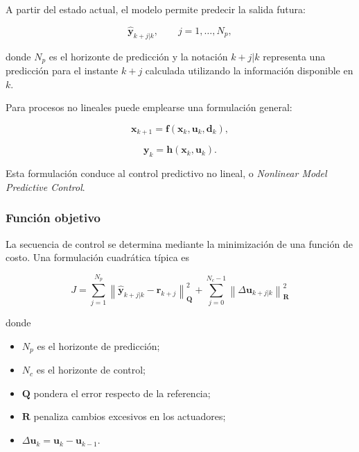 A partir del estado actual, el modelo permite predecir la salida futura:

\begin{equation}
\hat{\mathbf{y}}_{k+j|k},
\qquad
j=1,\ldots,N_p,
\end{equation}

donde $N_p$ es el horizonte de predicción y la notación $k+j|k$ representa una predicción para el instante $k+j$ calculada utilizando la información disponible en $k$.

Para procesos no lineales puede emplearse una formulación general:

\begin{equation}
\mathbf{x}_{k+1}
=
\mathbf{f}
\left(
\mathbf{x}_k,
\mathbf{u}_k,
\mathbf{d}_k
\right),
\end{equation}

\begin{equation}
\mathbf{y}_k
=
\mathbf{h}
\left(
\mathbf{x}_k,
\mathbf{u}_k
\right).
\end{equation}

Esta formulación conduce al control predictivo no lineal, o \textit{Nonlinear Model Predictive Control}.

\subsubsection{Función objetivo}

La secuencia de control se determina mediante la minimización de una función de costo. Una formulación cuadrática típica es

\begin{equation}
\boxed{
J
=
\sum_{j=1}^{N_p}
\left\|
\hat{\mathbf{y}}_{k+j|k}
-
\mathbf{r}_{k+j}
\right\|_{\mathbf{Q}}^2
+
\sum_{j=0}^{N_c-1}
\left\|
\Delta\mathbf{u}_{k+j|k}
\right\|_{\mathbf{R}}^2
}
\label{eq:costo_mpc}
\end{equation}

donde

\begin{itemize}
    \item $N_p$ es el horizonte de predicción;
    \item $N_c$ es el horizonte de control;
    \item $\mathbf{Q}$ pondera el error respecto de la referencia;
    \item $\mathbf{R}$ penaliza cambios excesivos en los actuadores;
    \item $\Delta\mathbf{u}_k=\mathbf{u}_k-\mathbf{u}_{k-1}$.
\end{itemize}

